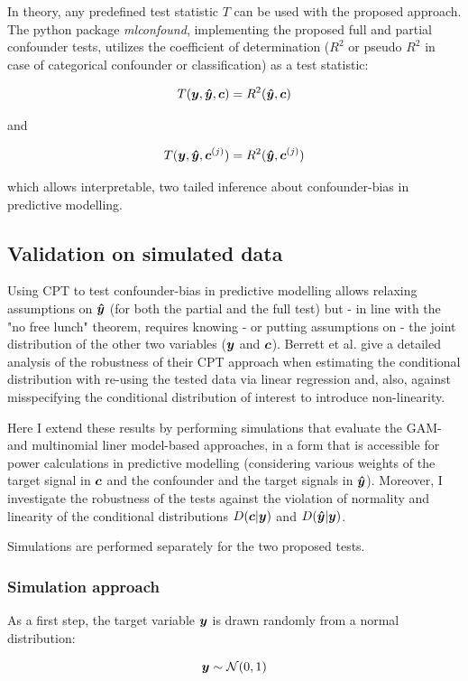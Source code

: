 \documentclass{article}
\begin{document}
In theory, any predefined test statistic $T$ can be used with the proposed approach. The python package \emph{mlconfound}, implementing the proposed full and partial confounder tests, utilizes the coefficient of determination ($R^2$ or pseudo $R^2$ in case of categorical confounder or classification\citep{starkweather2011multinomial}) as a test statistic:

$$T(\boldsymbol{y}, \boldsymbol{\hat{y}}, \boldsymbol{c}) = R^2(\boldsymbol{\hat{y}}, \boldsymbol{c})$$ 

and

$$T(\boldsymbol{y}, \boldsymbol{\hat{y}}, \boldsymbol{c}^{(j)}) = R^2(\boldsymbol{\hat{y}}, \boldsymbol{c}^{(j)})$$ 

which allows interpretable, two tailed inference about confounder-bias in predictive modelling.


\subsection{Validation on simulated data}

Using CPT to test confounder-bias in predictive modelling allows relaxing assumptions on $\boldsymbol{\hat{y}}$ (for both the partial and the full test) but - in line with the "no free lunch" theorem, requires knowing - or putting assumptions on - the joint distribution of the other two variables ($\boldsymbol{y}$ and $\boldsymbol{c}$). 
Berrett et al. \cite{berrett2020conditional} give a detailed analysis of the robustness of their CPT approach when estimating the conditional distribution with re-using the tested data via linear regression and, also, against misspecifying the conditional distribution of interest to introduce non-linearity.

Here I extend these results by performing simulations that evaluate the GAM- and multinomial liner model-based approaches, in a form that is accessible for power calculations in predictive modelling (considering various weights of the target signal in $\boldsymbol{c}$ and the confounder and the target signals in $\boldsymbol{\hat{y}}$).
Moreover, I investigate the robustness of the tests against the violation of normality and linearity of the conditional distributions $D(\boldsymbol{c}|\boldsymbol{y})$ and $D(\boldsymbol{\hat{y}}|\boldsymbol{y})$.

Simulations are performed separately for the two proposed tests.

\subsubsection*{Simulation approach}
As  a first step, the target variable $\boldsymbol{y}$ is drawn randomly from a normal distribution:

$$ \boldsymbol{y} \sim \mathcal{N}(0, 1) $$
\end{document}
